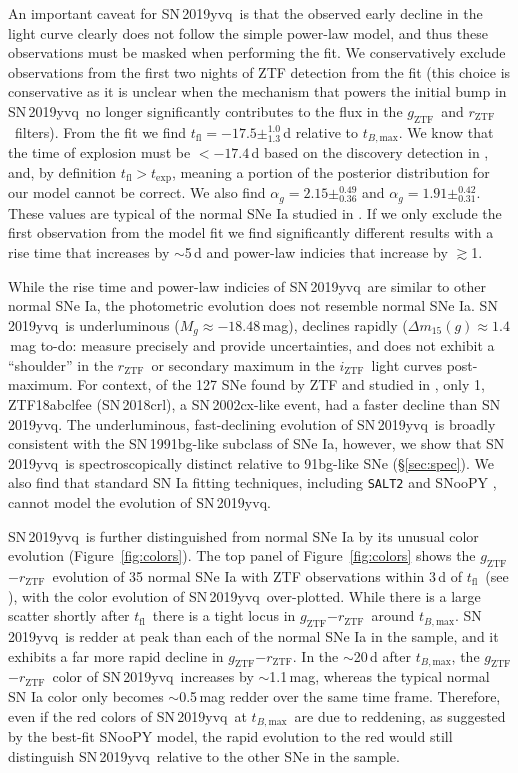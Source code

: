 \documentclass[twocolumn]{aastex63}
\newcommand{\todo}[1]{{\color{magenta} to-do: {#1}}}
\newcommand{\rztf}{$r_\mathrm{ZTF}$}
\newcommand{\gztf}{$g_\mathrm{ZTF}$}
\newcommand{\iztf}{$i_\mathrm{ZTF}$}
\newcommand{\tfl}{$t_\mathrm{fl}$}
\newcommand{\tbmax}{$t_{B,\mathrm{max}}$}
\newcommand{\sn}{SN\,2019yvq}
\begin{document}
An important caveat for \sn\ is that the observed early decline in the light
curve clearly does not follow the simple power-law model, and thus these
observations must be masked when performing the fit. We conservatively
exclude observations from the first two nights of ZTF detection from the fit
(this choice is conservative as it is unclear when the mechanism that powers
the initial bump in \sn\ no longer significantly contributes to the flux in
the \gztf\ and \rztf\ filters). From the fit we find \tfl$ = -17.5
\pm^{1.0}_{1.3}$\,d relative to \tbmax. We know that the time of explosion
must be $< -17.4$\,d based on the discovery detection in \citealt{Itagaki19},
and, by definition \tfl$> t_\mathrm{exp}$, meaning a portion of the posterior
distribution for our model cannot be correct. We also find $\alpha_g = 2.15
\pm^{0.49}_{0.36}$ and $\alpha_g = 1.91 \pm^{0.42}_{0.31}$. These values are
typical of the normal SNe Ia studied in \citet{Miller20}. If we only exclude
the first observation from the model fit we find significantly different
results with a rise time that increases by $\sim$5\,d and power-law indicies
that increase by $\gtrsim$1.

While the rise time and power-law indicies of \sn\ are similar to other
normal SNe Ia, the photometric evolution does not resemble normal SNe Ia.
\sn\ is underluminous ($M_g \approx -18.48$\,mag), declines rapidly ($\Delta
m_{15}(g) \approx 1.4$\,mag \todo{measure precisely and provide
uncertainties}, and does not exhibit a ``shoulder'' in the \rztf\ or
secondary maximum in the \iztf\ light curves post-maximum. For context, of
the 127 SNe found by ZTF and studied in \citet{Yao19}, only 1, ZTF18abclfee
(SN\,2018crl), a SN\,2002cx-like event, had a faster decline than \sn. The
underluminous, fast-declining evolution of \sn\ is broadly consistent with
the SN\,1991bg-like subclass of SNe Ia, however, we show that \sn\ is
spectroscopically distinct relative to 91bg-like SNe (\S\ref{sec:spec}). We
also find that standard SN Ia fitting techniques, including \texttt{SALT2}
\citep{Guy07} and SNooPY \citep{Burns11}, cannot model the evolution of \sn.

\sn\ is further distinguished from normal SNe Ia by its unusual color
evolution (Figure~\ref{fig:colors}). The top panel of Figure~\ref{fig:colors}
shows the \gztf$ - $\rztf\ evolution of 35 normal SNe Ia with ZTF
observations within 3\,d of \tfl\ (see \citealt{Bulla20}), with the color
evolution of \sn\ over-plotted. While there is a large scatter shortly after
\tfl\ there is a tight locus in \gztf$ - $\rztf\ around \tbmax. \sn\ is
redder at peak than each of the normal SNe Ia in the \citet{Bulla20} sample,
and it exhibits a far more rapid decline in \gztf$ - $\rztf. In the
$\sim$20\,d after \tbmax, the \gztf$ - $\rztf\ color of \sn\ increases by
$\sim$1.1\,mag, whereas the typical normal SN Ia color only becomes
$\sim$0.5\,mag redder over the same time frame. Therefore, even if the red
colors of \sn\ at \tbmax\ are due to reddening, as suggested by the best-fit
SNooPY model, the rapid evolution to the red would still distinguish \sn\
relative to the other SNe in the sample.
\end{document}
